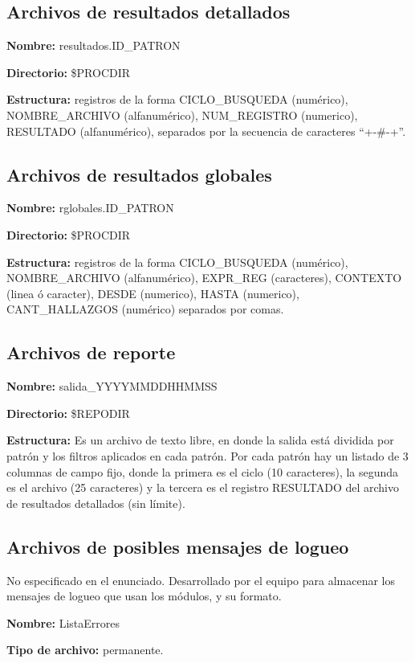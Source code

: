 \documentclass[a4paper,12pt]{article}
\begin{document}
\subsection{Archivos de resultados detallados}

{\bf Nombre:} resultados.ID\_PATRON

{\bf Directorio:} \$PROCDIR

{\bf Estructura:} registros de la forma CICLO\_BUSQUEDA (numérico), NOMBRE\_ARCHIVO (alfanumérico), NUM\_REGISTRO (numerico), RESULTADO (alfanumérico), separados por la secuencia de caracteres ``+-\#-+''.

\subsection{Archivos de resultados globales}

{\bf Nombre:} rglobales.ID\_PATRON

{\bf Directorio:} \$PROCDIR

{\bf Estructura:} registros de la forma CICLO\_BUSQUEDA (numérico), NOMBRE\_ARCHIVO (alfanumérico), EXPR\_REG (caracteres), CONTEXTO (linea ó caracter), DESDE (numerico), HASTA (numerico), CANT\_HALLAZGOS (numérico) separados por comas.

\subsection{Archivos de reporte}

{\bf Nombre:} salida\_YYYYMMDDHHMMSS

{\bf Directorio:} \$REPODIR

{\bf Estructura:} Es un archivo de texto libre, en donde la salida está dividida por patrón y los filtros aplicados en cada patrón. Por cada patrón hay un listado de 3 columnas de campo fijo, donde la primera es el ciclo (10 caracteres), la segunda es el archivo (25 caracteres) y la tercera es el registro RESULTADO del archivo de resultados detallados (sin límite).

\subsection{Archivos de posibles mensajes de logueo}

No especificado en el enunciado. Desarrollado por el equipo para almacenar los mensajes de logueo que usan los módulos, y su formato.

{\bf Nombre:} ListaErrores

{\bf Tipo de archivo:} permanente.
\end{document}
